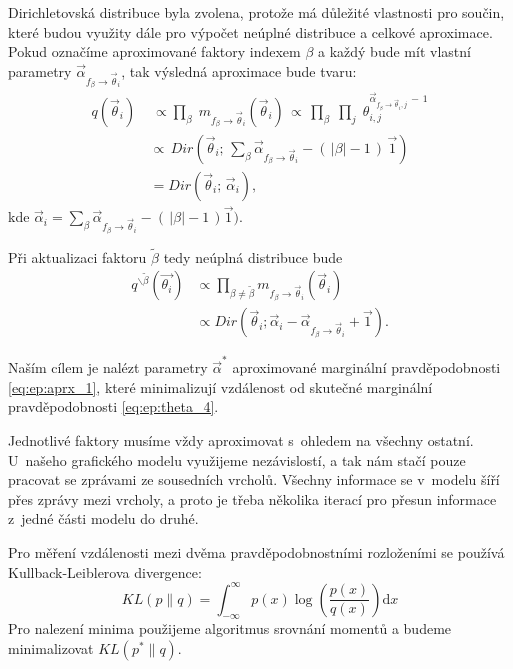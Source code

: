 Dirichletovská distribuce byla zvolena, protože má důležité vlastnosti pro
součin, které budou využity dále pro výpočet neúplné distribuce a celkové
aproximace. Pokud označíme aproximované faktory indexem $\beta$ a každý bude
mít vlastní parametry $\vec\alpha_{f_\beta \rightarrow \vec\theta_i}$, tak výsledná aproximace bude
tvaru:
\begin{align}
q(\vec{\theta}_i) \,& \, \propto
    \prod_\beta \;
    m_{f_\beta \rightarrow \vec{\theta}_i}(\vec{\theta}_i) \,
 \propto \,
    \prod_\beta \;
        \prod_j \;
            \theta_{i,j}^{\vec\alpha_{f_\beta \rightarrow \vec\theta_i, j} \,-\, 1}
\\
&\propto \,
    Dir(\vec{\theta}_i ;\, \sum_\beta \vec\alpha_{f_\beta \rightarrow \vec\theta_i} - (\,|\beta| - 1\,) \, \vec{1})
\\
&=
    Dir(\vec{\theta}_i;\,
        \vec{\alpha}_i),
\label{eq:ep:aprx_1}
\end{align}
kde $\vec{\alpha}_i = \sum_\beta \vec\alpha_{f_\beta \rightarrow \vec\theta_i} - (\,|\beta| - 1\,)
\vec{1})$.

Při aktualizaci faktoru $\tilde\beta$ tedy neúplná distribuce bude
\begin{align}
q^{\backslash \tilde\beta} (\vec{\theta_i})
&\propto
    \prod_{\beta \ne \tilde\beta}
        m_{f_\beta \rightarrow \vec{\theta}_i}(\vec{\theta}_i)
\\
& \propto
Dir(\vec{\theta}_i;
    \vec{\alpha}_i - \vec\alpha_{f_\beta \rightarrow \vec\theta_i} + \vec{1}).
\end{align}

Naším cílem je nalézt parametry $\vec{\alpha}^*$ aproximované marginální pravděpodobnosti \eqref{eq:ep:aprx_1}, které minimalizují vzdálenost od skutečné marginální pravděpodobnosti \eqref{eq:ep:theta_4}. 

Jednotlivé faktory musíme vždy aproximovat s~ohledem na všechny ostatní.
U~našeho grafického modelu využijeme nezávislostí, a tak nám stačí pouze pracovat se zprávami ze sousedních vrcholů.
Všechny informace se v~modelu šíří přes zprávy mezi vrcholy, a proto je třeba několika iterací pro přesun informace z~jedné části modelu do druhé.

Pro měření vzdálenosti mezi dvěma pravděpodobnostními rozloženími se používá Kullback-Leiblerova divergence:
\begin{equation}
KL(p \| q) =
\int_{-\infty}^{\infty}
    p(x) \log\left(\frac{p(x)}{q(x)}\right) \mathrm{d}x
\end{equation}
Pro nalezení minima použijeme algoritmus srovnání momentů a budeme
minimalizovat $KL(p^*\| q)$.


